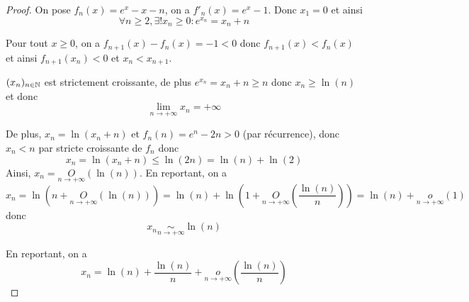 \documentclass[12pt]{article}
\begin{document}
\begin{proof}
	On pose $f_{n}(x)=e^{x}-x-n$, on a $f'_{n}(x)=e^{x}-1$. Donc $x_{1}=0$ et ainsi 
	\begin{equation*}\boxed{\forall n\geqslant 2,\exists! x_n\geqslant0\colon e^{x_{n}}=x_{n}+n}\end{equation*}

	Pour tout $x\geqslant0$, on a $f_{n+1}(x)-f_{n}(x)=-1<0$ donc $f_{n+1}(x)<f_{n}(x)$ et ainsi $f_{n+1}(x_{n})<0$ et $x_{n}<x_{n+1}$.

	$(x_{n})_{n\in\mathbb{N}}$ est strictement croissante, de plus $e^{x_{n}}=x_{n}+n\geqslant n$ donc $x_{n}\geqslant \ln(n)$ et donc 
	\begin{equation*}\boxed{\lim\limits_{n\to+\infty}x_{n}=+\infty}\end{equation*}

	De plus, $x_{n}=\ln(x_{n}+n)$ et $f_{n}(n)=e^{n}-2n>0$ (par récurrence), donc $x_{n}<n$ par stricte croissante de $f_{n}$ donc 
	\begin{equation*}x_{n}=\ln(x_{n}+n)\leqslant \ln(2n)=\ln(n)+\ln(2)\end{equation*}
	Ainsi, $x_{n}=\underset{n\to+\infty}{O}(\ln(n))$. En reportant, on a 
	\begin{equation*}x_{n}=\ln(n+\underset{n\to+\infty}{O}(\ln(n)))=\ln(n)+\ln(1+\underset{n\to+\infty}{O}\left(\frac{\ln(n)}{n}\right))=\ln(n)+\underset{n\to+\infty}{o}(1)\end{equation*}
	donc 
	\begin{equation*}\boxed{x_n\underset{n\to+\infty}{\sim}\ln(n)}\end{equation*}

	En reportant, on a 
	\begin{equation*}\boxed{x_{n}=\ln(n)+\frac{\ln(n)}{n}+\underset{n\to+\infty}{o}\left(\frac{\ln(n)}{n}\right)}\end{equation*}
\end{proof}
\end{document}
